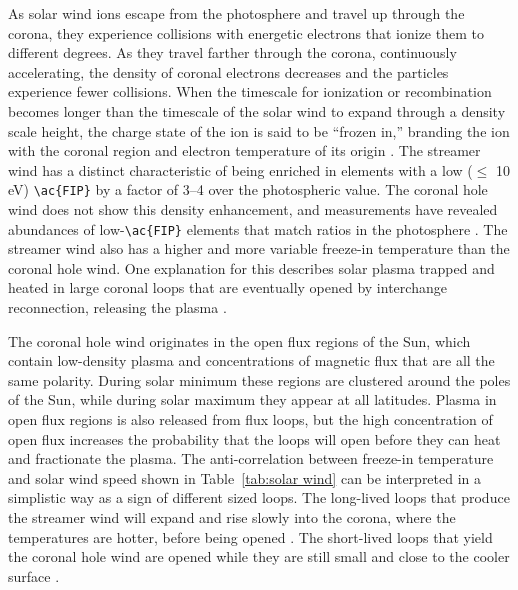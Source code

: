 As solar wind ions escape from the photosphere and travel up through the corona, they experience collisions with energetic electrons that ionize them to different degrees. As they travel farther through the corona, continuously accelerating, the density of coronal electrons decreases and the particles experience fewer collisions. When the timescale for ionization or recombination becomes longer than the timescale of the solar wind to expand through a density scale height, the charge state of the ion is said to be ``frozen in,'' branding the ion with the coronal region and electron temperature of its origin \citep{hundhausen68}. The streamer wind has a distinct characteristic of being enriched in elements with a low ($\le$ 10 eV) \verb!\ac{FIP}! by a factor of 3--4 over the photospheric value. The coronal hole wind does not show this density enhancement, and measurements have revealed abundances of low-\verb!\ac{FIP}! elements that match ratios in the photosphere \citep{vonsteiger93}. The streamer wind also has a higher and more variable freeze-in temperature than the coronal hole wind. One explanation for this describes solar plasma trapped and heated in large coronal loops that are eventually opened by interchange reconnection, releasing the plasma \citep{gosling95, fisk98, fisk99a}.

The coronal hole wind originates in the open flux regions of the Sun, which contain low-density plasma and concentrations of magnetic flux that are all the same polarity. During solar minimum these regions are clustered around the poles of the Sun, while during solar maximum they appear at all latitudes. Plasma in open flux regions is also released from flux loops, but the high concentration of open flux increases the probability that the loops will open before they can heat and fractionate the plasma. The anti-correlation between freeze-in temperature and solar wind speed shown in Table~\ref{tab:solar wind} can be interpreted in a simplistic way as a sign of different sized loops. The long-lived loops that produce the streamer wind will expand and rise slowly into the corona, where the temperatures are hotter, before being opened \citep{fisk98, fisk01a}. The short-lived loops that yield the coronal hole wind are opened while they are still small and close to the cooler surface \citep{fisk99a, fisk03, wimmer03b}.
